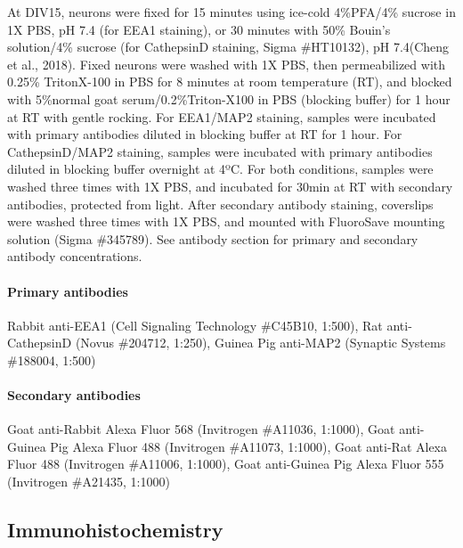 At DIV15, neurons were fixed for 15 minutes using ice-cold 4\%PFA/4\% sucrose in
1X PBS, pH 7.4 (for EEA1 staining), or 30 minutes with 50\% Bouin’s solution/4\%
sucrose (for CathepsinD staining, Sigma \#HT10132), pH 7.4(Cheng et al., 2018).
Fixed neurons were washed with 1X PBS, then permeabilized with 0.25\%
TritonX-100 in PBS for 8 minutes at room temperature (RT), and blocked with
5\%normal goat serum/0.2\%Triton-X100 in PBS (blocking buffer) for 1 hour at RT
with gentle rocking. For EEA1/MAP2 staining, samples were incubated with primary
antibodies diluted in blocking buffer at RT for 1 hour. For CathepsinD/MAP2
staining, samples were incubated with primary antibodies diluted in blocking
buffer overnight at 4ºC. For both conditions, samples were washed three times
with 1X PBS, and incubated for 30min at RT with secondary antibodies, protected
from light. After secondary antibody staining, coverslips were washed three
times with 1X PBS, and mounted with FluoroSave mounting solution (Sigma
\#345789). See antibody section for primary and secondary antibody
concentrations. 

\paragraph{Primary antibodies} Rabbit anti-EEA1 (Cell Signaling
Technology \#C45B10, 1:500), Rat anti-CathepsinD (Novus \#204712, 1:250), Guinea
Pig anti-MAP2 (Synaptic Systems \#188004, 1:500)

\paragraph{Secondary antibodies} Goat anti-Rabbit Alexa Fluor 568
(Invitrogen \#A11036, 1:1000), Goat anti-Guinea Pig Alexa Fluor 488 (Invitrogen
\#A11073, 1:1000), Goat anti-Rat Alexa Fluor 488 (Invitrogen \#A11006, 1:1000),
Goat anti-Guinea Pig Alexa Fluor 555 (Invitrogen \#A21435, 1:1000)

\subsection{Immunohistochemistry}

